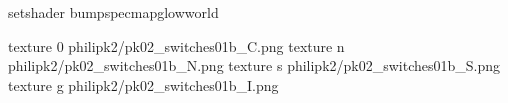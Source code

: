 setshader bumpspecmapglowworld


texture 0 philipk2/pk02_switches01b_C.png
texture n philipk2/pk02_switches01b_N.png
texture s philipk2/pk02_switches01b_S.png
texture g philipk2/pk02_switches01b_I.png

